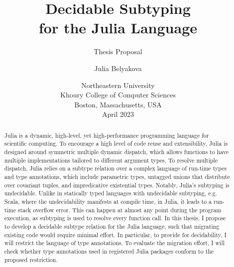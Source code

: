 \title{Decidable Subtyping\\for the Julia Language}
\subtitle{Thesis Proposal}

\author{Julia Belyakova}

\date{\normalsize%
Northeastern University\\
Khoury College of Computer Sciences\\
Boston, Massachusetts, USA\\
April 2023
}

\maketitle


\begin{abstract}

Julia is a dynamic, high-level, yet high-performance programming language
for scientific computing.
To encourage a high level of code reuse and extensibility, Julia is
designed around symmetric multiple dynamic dispatch, which allows functions
to have multiple implementations tailored to different argument types.
To resolve multiple dispatch, Julia relies on a subtype relation over a complex
language of run-time types and type annotations, which include parametric types,
untagged unions that distribute over covariant tuples, and impredicative
existential types.
Notably, Julia's subtyping is undecidable.
Unlike in statically typed languages
with undecidable subtyping, e.g. Scala, where the undecidability manifests at
compile time, in Julia, it leads to a run-time stack overflow error. 
This can happen
at almost any point during the program execution, as subtyping is used to
resolve every function call.
In this thesis, I propose to develop a decidable subtype relation
for the Julia language,
such that migrating existing code would require minimal effort.
In particular, to provide for decidability, I will restrict the language of type
annotations. To evaluate the migration effort, I will check whether
type annotations used in registered Julia packages conform to the proposed
restriction.

\end{abstract}


\tableofcontents
